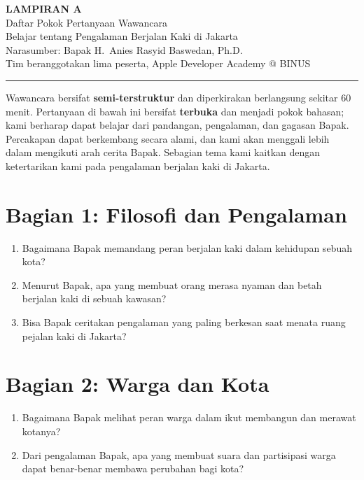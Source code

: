 \documentclass[11pt,a4paper]{article}
\begin{document}
\begin{center}
  {\Large\bfseries LAMPIRAN A}\\[4pt]
  {\large Daftar Pokok Pertanyaan Wawancara}\\[2pt]
  {\normalsize Belajar tentang Pengalaman Berjalan Kaki di Jakarta}\\[2pt]
  {\small Narasumber: Bapak H.~Anies Rasyid Baswedan, Ph.D.}\\
  {\small Tim beranggotakan lima peserta, Apple Developer Academy @ BINUS}
\end{center}

\vspace{4pt}
\hrule
\vspace{12pt}

\noindent
Wawancara bersifat \textbf{semi-terstruktur} dan diperkirakan berlangsung sekitar 60 menit.
Pertanyaan di bawah ini bersifat \textbf{terbuka} dan menjadi pokok bahasan; kami berharap dapat
belajar dari pandangan, pengalaman, dan gagasan Bapak. Percakapan dapat berkembang secara alami,
dan kami akan menggali lebih dalam mengikuti arah cerita Bapak. Sebagian tema kami kaitkan dengan
ketertarikan kami pada pengalaman berjalan kaki di Jakarta.

\vspace{6pt}

\section*{Bagian 1: Filosofi dan Pengalaman}
\begin{enumerate}[label=\arabic*., itemsep=6pt, leftmargin=*]
  \item Bagaimana Bapak memandang peran berjalan kaki dalam kehidupan sebuah kota?
  \item Menurut Bapak, apa yang membuat orang merasa nyaman dan betah berjalan kaki di sebuah
        kawasan?
  \item Bisa Bapak ceritakan pengalaman yang paling berkesan saat menata ruang pejalan kaki di
        Jakarta?
\end{enumerate}

\section*{Bagian 2: Warga dan Kota}
\begin{enumerate}[label=\arabic*., itemsep=6pt, leftmargin=*, start=4]
  \item Bagaimana Bapak melihat peran warga dalam ikut membangun dan merawat kotanya?
  \item Dari pengalaman Bapak, apa yang membuat suara dan partisipasi warga dapat benar-benar
        membawa perubahan bagi kota?
\end{enumerate}
\end{document}

